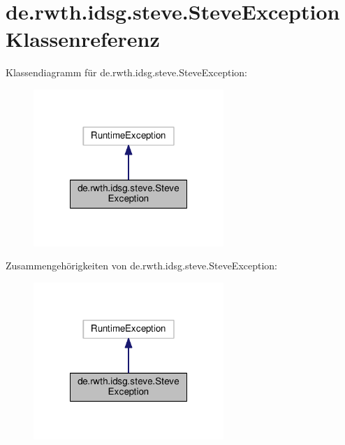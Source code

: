 \hypertarget{classde_1_1rwth_1_1idsg_1_1steve_1_1_steve_exception}{\section{de.\-rwth.\-idsg.\-steve.\-Steve\-Exception Klassenreferenz}
\label{classde_1_1rwth_1_1idsg_1_1steve_1_1_steve_exception}
}


Klassendiagramm für de.\-rwth.\-idsg.\-steve.\-Steve\-Exception\-:\nopagebreak
\begin{figure}[H]
\begin{center}
\leavevmode
\includegraphics[width=204pt]{classde_1_1rwth_1_1idsg_1_1steve_1_1_steve_exception__inherit__graph}
\end{center}
\end{figure}


Zusammengehörigkeiten von de.\-rwth.\-idsg.\-steve.\-Steve\-Exception\-:\nopagebreak
\begin{figure}[H]
\begin{center}
\leavevmode
\includegraphics[width=204pt]{classde_1_1rwth_1_1idsg_1_1steve_1_1_steve_exception__coll__graph}
\end{center}
\end{figure}
